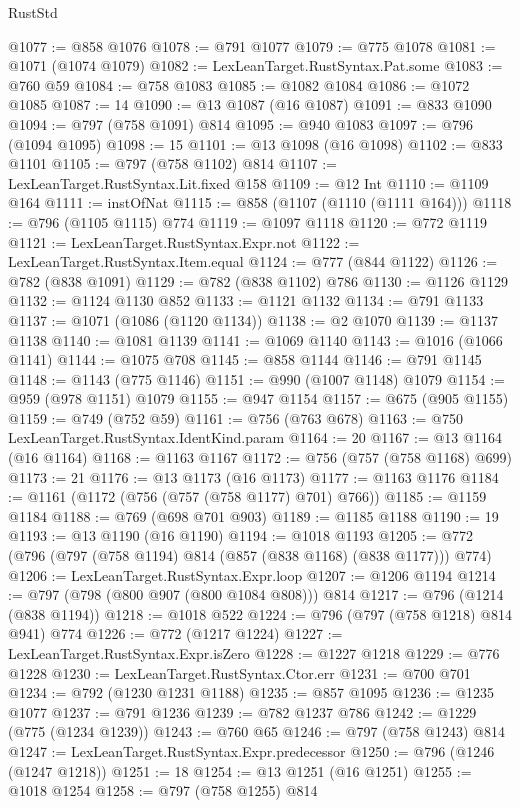 \begin{lexlean}{RustStd}
\begin{coremodule}
{\begin{coremodule}
{{{{{{{{{{{{{{@1077 := @858 @1076
@1078 := @791 @1077
@1079 := @775 @1078
@1081 := @1071 (@1074 @1079)
@1082 := LexLeanTarget.RustSyntax.Pat.some
@1083 := @760 @59
@1084 := @758 @1083
@1085 := @1082 @1084
@1086 := @1072 @1085
@1087 := 14
@1090 := @13 @1087 (@16 @1087)
@1091 := @833 @1090
@1094 := @797 (@758 @1091) @814
@1095 := @940 @1083
@1097 := @796 (@1094 @1095)
@1098 := 15
@1101 := @13 @1098 (@16 @1098)
@1102 := @833 @1101
@1105 := @797 (@758 @1102) @814
@1107 := LexLeanTarget.RustSyntax.Lit.fixed @158
@1109 := @12 Int
@1110 := @1109 @164
@1111 := instOfNat
@1115 := @858 (@1107 (@1110 (@1111 @164)))
@1118 := @796 (@1105 @1115) @774
@1119 := @1097 @1118
@1120 := @772 @1119
@1121 := LexLeanTarget.RustSyntax.Expr.not
@1122 := LexLeanTarget.RustSyntax.Item.equal
@1124 := @777 (@844 @1122)
@1126 := @782 (@838 @1091)
@1129 := @782 (@838 @1102) @786
@1130 := @1126 @1129
@1132 := @1124 @1130 @852
@1133 := @1121 @1132
@1134 := @791 @1133
@1137 := @1071 (@1086 (@1120 @1134))
@1138 := @2 @1070
@1139 := @1137 @1138
@1140 := @1081 @1139
@1141 := @1069 @1140
@1143 := @1016 (@1066 @1141)
@1144 := @1075 @708
@1145 := @858 @1144
@1146 := @791 @1145
@1148 := @1143 (@775 @1146)
@1151 := @990 (@1007 @1148) @1079
@1154 := @959 (@978 @1151) @1079
@1155 := @947 @1154
@1157 := @675 (@905 @1155)
@1159 := @749 (@752 @59)
@1161 := @756 (@763 @678)
@1163 := @750 LexLeanTarget.RustSyntax.IdentKind.param
@1164 := 20
@1167 := @13 @1164 (@16 @1164)
@1168 := @1163 @1167
@1172 := @756 (@757 (@758 @1168) @699)
@1173 := 21
@1176 := @13 @1173 (@16 @1173)
@1177 := @1163 @1176
@1184 := @1161 (@1172 (@756 (@757 (@758 @1177) @701) @766))
@1185 := @1159 @1184
@1188 := @769 (@698 @701 @903)
@1189 := @1185 @1188
@1190 := 19
@1193 := @13 @1190 (@16 @1190)
@1194 := @1018 @1193
@1205 := @772 (@796 (@797 (@758 @1194) @814 (@857 (@838 @1168) (@838 @1177))) @774)
@1206 := LexLeanTarget.RustSyntax.Expr.loop
@1207 := @1206 @1194
@1214 := @797 (@798 (@800 @907 (@800 @1084 @808))) @814
@1217 := @796 (@1214 (@838 @1194))
@1218 := @1018 @522
@1224 := @796 (@797 (@758 @1218) @814 @941) @774
@1226 := @772 (@1217 @1224)
@1227 := LexLeanTarget.RustSyntax.Expr.isZero
@1228 := @1227 @1218
@1229 := @776 @1228
@1230 := LexLeanTarget.RustSyntax.Ctor.err
@1231 := @700 @701
@1234 := @792 (@1230 @1231 @1188)
@1235 := @857 @1095
@1236 := @1235 @1077
@1237 := @791 @1236
@1239 := @782 @1237 @786
@1242 := @1229 (@775 (@1234 @1239))
@1243 := @760 @65
@1246 := @797 (@758 @1243) @814
@1247 := LexLeanTarget.RustSyntax.Expr.predecessor
@1250 := @796 (@1246 (@1247 @1218))
@1251 := 18
@1254 := @13 @1251 (@16 @1251)
@1255 := @1018 @1254
@1258 := @797 (@758 @1255) @814
}}}}}}}}}}}}}}
\end{coremodule}}
\end{coremodule}
\end{lexlean}
